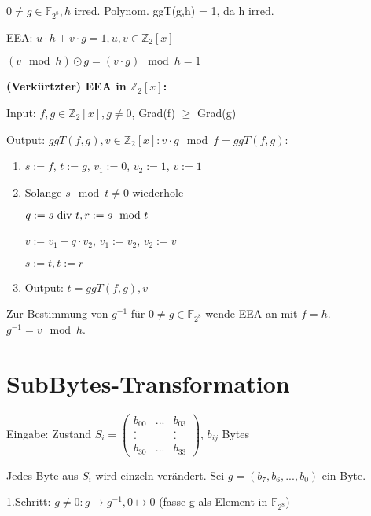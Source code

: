 $0 \neq g \in \mathbb{F}_{2^8}, h$ irred. Polynom. ggT(g,h) = 1, da h irred.

\par \medskip

EEA: $u \cdot h + v \cdot g = 1, u,v \in \mathbb{Z}_{2}[x]$

$(v \mod h) \odot g = (v \cdot g) \mod h = 1$

\par \medskip

\textbf{(Verkürtzter) EEA in $\mathbb{Z}_2[x]$:}


Input: $f,g \in \mathbb{Z}_2[x], g \neq 0$, Grad(f) $\geq$ Grad(g)

Output: $ggT(f,g), v \in \mathbb{Z}_2[x]: v \cdot g \mod f = ggT(f,g)$:

\begin{enumerate}
  \item $s := f$, $t:=g$, $v_1 := 0$, $v_2 := 1$, $v:=1$
  \item Solange $s \mod t \neq 0$ wiederhole

  $q:= s \textnormal{ div } t, r := s \mod t$

  $v := v_1 - q \cdot v_2$, $v_1 := v_2$, $v_2 := v$

  $s := t, t := r$

  \item Output: $t = ggT(f,g), v$
\end{enumerate}

Zur Bestimmung von $g^{-1}$ für $0 \neq g \in \mathbb{F}_{2^8}$ wende EEA an mit $f = h$. $g^{-1} = v \mod h$. 

\section{SubBytes-Transformation}

Eingabe: Zustand $S_i = \begin{pmatrix}b_{00} & ... & b_{03} \\ . & & . \\ . & & . \\ b_{30} & ... & b_{33} \end{pmatrix}$, $b_{ij}$ Bytes

Jedes Byte aus $S_i$ wird einzeln verändert. Sei $g = (b_7,b_6,...,b_0)$ ein Byte.

\par \medskip

\underline{1.Schritt:} $g \neq 0: g \mapsto g^{-1}, 0 \mapsto 0$ (fasse g als Element in $\mathbb{F}_{2^8}$)

